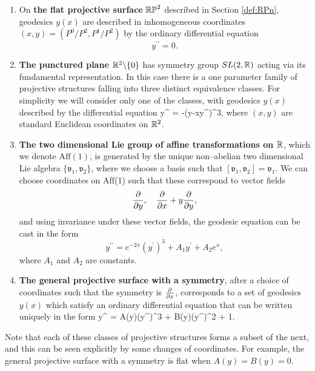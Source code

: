 \begin{enumerate}
\item On {\bf the flat projective surface} $\mathbb{RP}^2$ described in Section \ref{def:RPn}, geodesics $y(x)$ are described in inhomogeneous coordinates $(x,y)=({P^0}/{P^2},{P^1}/{P^2})$ by the ordinary differential equation
\[
y^{\prime\prime}=0.
\]
\item {\bf The punctured plane $\mathbb{R}^2\backslash\{0\}$} has symmetry group $SL(2,\mathbb{R})$ acting via its fundamental representation. In this case there is a one parameter family of projective structures falling into three distinct equivalence classes. For simplicity we will consider only one of the classes, with geodesics $y(x)$ described by the differential equation
\be \label{eq:submaxODE}
y^{\prime\prime} = -(y-xy^\prime)^3,
\ee
where $(x,y)$ are standard Euclidean coordinates on $\mathbb{R}^2$.
\item {\bf The two dimensional Lie group of affine transformations on $\mathbb{R}$}, which we denote $\mathrm{Aff}(1)$, is generated by the unique non--abelian two dimensional Lie algebra $\{\mathfrak{v}_1,\mathfrak{v}_2\}$, where we choose a basis such that $[\mathfrak{v}_1,\mathfrak{v}_2]=\mathfrak{v}_1$. We can choose coordinates on $\mathrm{Aff}$(1) such that these correspond to vector fields
\[
\frac{\partial}{\partial y},\quad \frac{\partial}{\partial x} + y\frac{\partial}{\partial y},
\]
and using invariance under these vector fields, the geodesic equation can be cast in the form \cite{FLL}
\[
y^{\prime\prime} = e^{-2x}(y^\prime)^3 + A_1y^\prime + A_2e^x,
\]
where $A_1$ and $A_2$ are constants.
\item {\bf The general projective surface with a symmetry}, after a choice of coordinates such that the symmetry is $\frac{\partial}{\partial x}$, corresponds to a set of geodesics $y(x)$ which satisfy an ordinary differential equation that can be written uniquely in the form \cite{FLL}
\be \label{eq:1symode}
y^{\prime\prime} = A(y)(y^\prime)^3 + B(y)(y^\prime)^2 + 1.
\ee
\end{enumerate}

\noindent Note that each of these classes of projective structures forms a subset of the next, and this can be seen explicitly by some changes of coordinates. For example, the general projective surface with a symmetry is flat when $A(y)=B(y)=0$.

